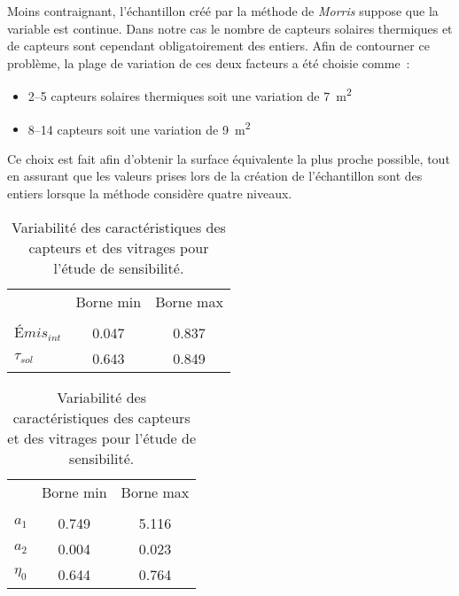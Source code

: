 Moins contraignant, l’échantillon créé par la méthode de \textit{Morris} suppose que
la variable est continue. Dans notre cas le nombre de capteurs solaires thermiques
et de capteurs  sont cependant obligatoirement des entiers. Afin de contourner
ce problème, la plage de variation de ces deux facteurs a été choisie comme~:
\begin{itemize}
  \item \SIrange{2}{5}{} capteurs solaires thermiques soit une variation de \SI{7}{\metre\squared}
  \item \SIrange{8}{14}{} capteurs  soit une variation de \SI{9}{\metre\squared}
\end{itemize}
Ce choix est fait afin d’obtenir la surface équivalente la plus proche possible, tout
en assurant que les valeurs prises lors de la création de l’échantillon sont des entiers
lorsque la méthode considère quatre niveaux.


\begin{table}
\centering
\caption{Variabilité des caractéristiques des capteurs et des vitrages pour l’étude
         de sensibilité.}
\label{tab:variabilite_capteur_vitrage}
\begin{minipage}[t][][b]{0.45\linewidth}
\begin{tabular}{l c c}
  \toprule
  \addlinespace
                                               & Borne min     & Borne max    \\
  \addlinespace[\defaultaddspace]
  \multicolumn{2}{l}{\textbf{Vitrages}}                                       \\
  \midrule
  $Émis_{int}$                                 & \num{0.047}   & \num{0.837}  \\
  $\tau_{sol}$                                 & \num{0.643}   & \num{0.849}  \\
  \bottomrule
  \end{tabular}
\end{minipage}%
\begin{minipage}[t][][b]{0.45\linewidth}
\begin{tabular}{l c c}
  \toprule
  \addlinespace
                                               & Borne min     & Borne max    \\
  \addlinespace[\defaultaddspace]
  \multicolumn{3}{l}{\textbf{Capteurs solaires}}                              \\
  \midrule
  $a_{1}$                                      & \num{0.749}   &  \num{5.116} \\
  $a_{2}$                                      & \num{0.004}   &  \num{0.023} \\
  $\eta_{0}$                                   & \num{0.644}   &  \num{0.764} \\
  \bottomrule
  \end{tabular}
\end{minipage}
\end{table}



